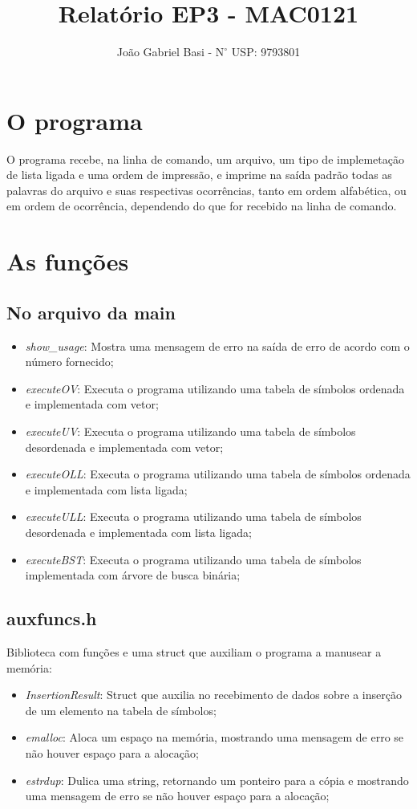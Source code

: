 \documentclass[12pt, a4paper]{article} %
\title{Relatório EP3 - MAC0121}
\date{}
\author{João Gabriel Basi - $\text{N}^\circ$ USP: 9793801}
\begin{document}
\maketitle
\section{O programa}
O programa recebe, na linha de comando, um arquivo, um tipo de implemetação de lista ligada e uma ordem de impressão, e imprime na saída padrão todas as palavras do arquivo e suas respectivas ocorrências, tanto em ordem alfabética, ou em ordem de ocorrência, dependendo do que for recebido na linha de comando.

\section{As funções}
	\subsection{No arquivo da main}
	\begin{itemize}
		\item \textit{show\_usage}: Mostra uma mensagem de erro na saída de erro de acordo com o número fornecido;
		\item \textit{executeOV}: Executa o programa utilizando uma tabela de símbolos ordenada e implementada com vetor;
		\item \textit{executeUV}: Executa o programa utilizando uma tabela de símbolos desordenada e implementada com vetor;
		\item \textit{executeOLL}: Executa o programa utilizando uma tabela de símbolos ordenada e implementada com lista ligada;
		\item \textit{executeULL}: Executa o programa utilizando uma tabela de símbolos desordenada e implementada com lista ligada;
		\item \textit{executeBST}: Executa o programa utilizando uma tabela de símbolos implementada com árvore de busca binária;
	\end{itemize}

	\subsection{auxfuncs.h}
	Biblioteca com funções e uma struct que auxiliam o programa a manusear a memória:
	\begin{itemize}
		\item \textit{InsertionResult}: Struct que auxilia no recebimento de dados sobre a inserção de um elemento na tabela de símbolos;
		\item \textit{emalloc}: Aloca um espaço na memória, mostrando uma mensagem de erro se não houver espaço para a alocação;
		\item \textit{estrdup}: Dulica uma string, retornando um ponteiro para a cópia e mostrando uma mensagem de erro se não houver espaço para a alocação;
	\end{itemize}
\end{document}
